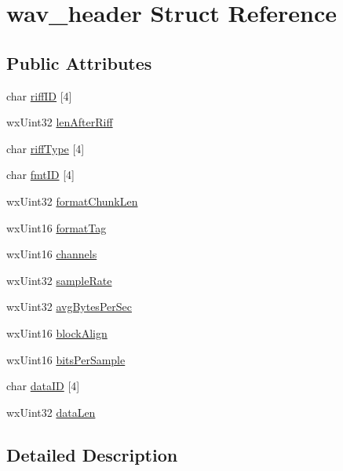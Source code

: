 \hypertarget{structwav__header}{}\section{wav\+\_\+header Struct Reference}
\label{structwav__header}
\subsection*{Public Attributes}
\begin{DoxyCompactItemize}
\item 
char \hyperlink{structwav__header_a46f51a7f8983f78160a17d7b8dbd9c32}{riff\+ID} \mbox{[}4\mbox{]}
\item 
wx\+Uint32 \hyperlink{structwav__header_a7143122f9e6f8e92c21dc1dd45424673}{len\+After\+Riff}
\item 
char \hyperlink{structwav__header_a3c12f39cfba24571294c0a155e7400f7}{riff\+Type} \mbox{[}4\mbox{]}
\item 
char \hyperlink{structwav__header_a00d73430c6209f3910251093a1d77c5e}{fmt\+ID} \mbox{[}4\mbox{]}
\item 
wx\+Uint32 \hyperlink{structwav__header_a2de7a0eda0c7197fc3f3eca5b088a5e4}{format\+Chunk\+Len}
\item 
wx\+Uint16 \hyperlink{structwav__header_a7b766f589966d872eee71b73a1299f43}{format\+Tag}
\item 
wx\+Uint16 \hyperlink{structwav__header_aefcdce3cf6cf96d6263206f00044c45c}{channels}
\item 
wx\+Uint32 \hyperlink{structwav__header_ab9b32a2583d8ec68fa0ee3314a18375d}{sample\+Rate}
\item 
wx\+Uint32 \hyperlink{structwav__header_a8148d52018f875c01dad92b38a6262ff}{avg\+Bytes\+Per\+Sec}
\item 
wx\+Uint16 \hyperlink{structwav__header_ad0610ad49707c63670844279d4ac1037}{block\+Align}
\item 
wx\+Uint16 \hyperlink{structwav__header_a53f6319c0666d17755849be891772e3a}{bits\+Per\+Sample}
\item 
char \hyperlink{structwav__header_a7a5f24b94773641e47e56628e106a280}{data\+ID} \mbox{[}4\mbox{]}
\item 
wx\+Uint32 \hyperlink{structwav__header_adc7cd5aee29ab313405e0c1730320afb}{data\+Len}
\end{DoxyCompactItemize}


\subsection{Detailed Description}



